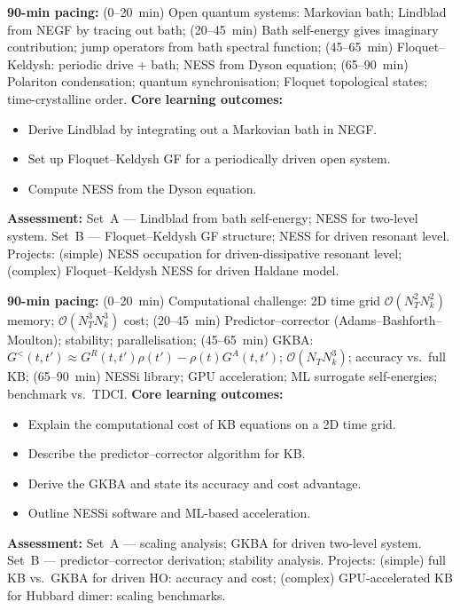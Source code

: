 \documentclass[11pt,a4paper]{article}
\begin{document}
\medskip

\begin{tcolorbox}[modulebox, title={Module~II.5 --- Lecture L11: Driven-Dissipative Systems}]
\textbf{90-min pacing:} (0--20~min) Open quantum systems: Markovian bath; Lindblad from NEGF by tracing out bath; (20--45~min) Bath self-energy gives imaginary contribution; jump operators from bath spectral function; (45--65~min) Floquet--Keldysh: periodic drive + bath; NESS from Dyson equation; (65--90~min) Polariton condensation; quantum synchronisation; Floquet topological states; time-crystalline order.
\medskip\textbf{Core learning outcomes:}
\begin{itemize}[leftmargin=1.4em,topsep=2pt,itemsep=1pt]
  \item Derive Lindblad by integrating out a Markovian bath in NEGF.
  \item Set up Floquet--Keldysh GF for a periodically driven open system.
  \item Compute NESS from the Dyson equation.
\end{itemize}
\medskip\textbf{Assessment:}
Set~A --- Lindblad from bath self-energy; NESS for two-level system.
Set~B --- Floquet--Keldysh GF structure; NESS for driven resonant level.
Projects: (simple) NESS occupation for driven-dissipative resonant level; (complex) Floquet--Keldysh NESS for driven Haldane model.
\end{tcolorbox}

\medskip

\begin{tcolorbox}[modulebox, title={Module~II.5 --- Lecture L12: Numerical Methods for NEGF}]
\textbf{90-min pacing:} (0--20~min) Computational challenge: 2D time grid $\mathcal{O}(N_T^2N_k^2)$ memory; $\mathcal{O}(N_T^3N_k^3)$ cost; (20--45~min) Predictor--corrector (Adams--Bashforth--Moulton); stability; parallelisation; (45--65~min) GKBA: $G^<(t,t')\approx G^R(t,t')\rho(t')-\rho(t)G^A(t,t')$; $\mathcal{O}(N_TN_k^3)$; accuracy vs.\ full KB; (65--90~min) NESSi library; GPU acceleration; ML surrogate self-energies; benchmark vs.\ TDCI.
\medskip\textbf{Core learning outcomes:}
\begin{itemize}[leftmargin=1.4em,topsep=2pt,itemsep=1pt]
  \item Explain the computational cost of KB equations on a 2D time grid.
  \item Describe the predictor--corrector algorithm for KB.
  \item Derive the GKBA and state its accuracy and cost advantage.
  \item Outline NESSi software and ML-based acceleration.
\end{itemize}
\medskip\textbf{Assessment:}
Set~A --- scaling analysis; GKBA for driven two-level system.
Set~B --- predictor--corrector derivation; stability analysis.
Projects: (simple) full KB vs.\ GKBA for driven HO: accuracy and cost; (complex) GPU-accelerated KB for Hubbard dimer: scaling benchmarks.
\end{tcolorbox}
\end{document}
